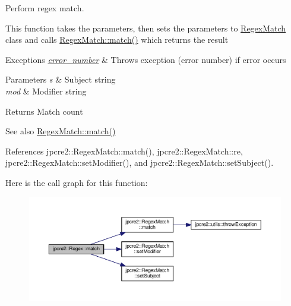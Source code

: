 Perform regex match. 

This function takes the parameters, then sets the parameters to \hyperlink{classjpcre2_1_1RegexMatch}{Regex\+Match} class and calls \hyperlink{classjpcre2_1_1RegexMatch_a5868aef3a146594ea1ebef34d122bb33}{Regex\+Match\+::match()} which returns the result 
\begin{DoxyExceptions}{Exceptions}
{\em \hyperlink{classjpcre2_1_1Regex_a91b7b795c9efe76ef4e015325ff33f1c}{error\+\_\+number}} & Throws exception (error number) if error occurs \\
\hline
\end{DoxyExceptions}

\begin{DoxyParams}{Parameters}
{\em s} & Subject string \\
\hline
{\em mod} & Modifier string \\
\hline
\end{DoxyParams}
\begin{DoxyReturn}{Returns}
Match count 
\end{DoxyReturn}
\begin{DoxySeeAlso}{See also}
\hyperlink{classjpcre2_1_1RegexMatch_a5868aef3a146594ea1ebef34d122bb33}{Regex\+Match\+::match()} 
\end{DoxySeeAlso}


References jpcre2\+::\+Regex\+Match\+::match(), jpcre2\+::\+Regex\+Match\+::re, jpcre2\+::\+Regex\+Match\+::set\+Modifier(), and jpcre2\+::\+Regex\+Match\+::set\+Subject().



Here is the call graph for this function\+:\nopagebreak
\begin{figure}[H]
\begin{center}
\leavevmode
\includegraphics[width=350pt]{classjpcre2_1_1Regex_ab93775a93a0a537d09b9e9ab4a5a3894_cgraph}
\end{center}
\end{figure}


